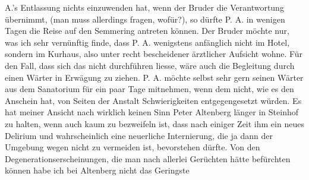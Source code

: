 \begin{ledgroupsized}[t]{13cm}
                  A.’s Entlassung nichts einzuwenden hat, wenn der Bruder die Verantwortung übernimmt, (man
               muss allerdings fragen, wofür?), so dürfte P.
                  A. in wenigen Tagen die Reise auf den Semmering antreten können. Der Bruder möchte nur, was ich sehr vernünftig finde, dass P. A. wenigstens anfänglich nicht im Hotel,
               sondern im Kurhaus, also unter recht bescheidener
               ärztlicher Aufsicht wohne. Für den Fall, dass sich das nicht durchführen liesse, wäre
               auch die Begleitung durch einen Wärter in Erwägung zu ziehen. P. A. möchte selbst sehr gern seinen Wärter aus dem Sanatorium für ein paar Tage
               mitnehmen, wenn dem nicht, wie es den Anschein hat, von Seiten der Anstalt
                  Schwierigkei{\pb}ten
               entgegengesetzt würden. Es hat meiner Ansicht nach wirklich keinen Sinn Peter Altenberg länger in Steinhof zu halten, wenn auch kaum zu bezweifeln ist, dass nach
               einiger Zeit ihm ein neues Delirium und wahrscheinlich eine neuerliche Internierung,
               die ja dann der Umgebung wegen nicht zu vermeiden ist, bevorstehen dürfte. Von den
               Degenerationserscheinungen, die man nach allerlei Gerüchten hätte befürchten können
               habe ich bei Altenberg nicht das Geringste

\end{ledgroupsized}
